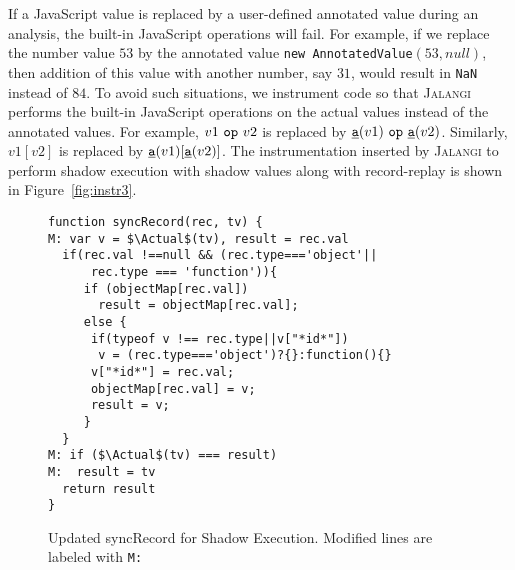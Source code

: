 \documentclass{sig-alternate}
\def\jalangi{\textsc{Jalangi}}
\newcommand \dsl [1] {\ensuremath{{\tt #1}}\xspace}
\newcommand \usl [1] {\mbox{\underline{\tt #1}}\xspace}
\newcommand \Actual{\usl{a}}
\begin{document}
If a JavaScript value is replaced by a user-defined annotated value
during an analysis, the built-in JavaScript operations will fail.  For
example, if we replace the number value $53$ by the annotated value
\texttt{new AnnotatedValue}$(53, null)$, then addition of this value
with another number, say $31$, would result in \texttt{NaN} instead of
$84$.  To avoid such situations, we instrument code so that \jalangi{}
performs the built-in JavaScript operations on the actual values
instead of the annotated values.  For example, $v1\ \dsl{op}\ v2$ is
replaced by $\Actual(v1)\ \dsl{op}\ \Actual(v2)$.  Similarly, $v1[v2]$
is replaced by $\Actual(v1)[\Actual(v2)]$.  The instrumentation
inserted by \jalangi{} to perform shadow execution with shadow values
along with record-replay is shown in Figure~\ref{fig:instr3}.

\lstset{language=JavaScript}
\begin{figure}
 {\scriptsize
\begin{lstlisting}[mathescape]
function syncRecord(rec, tv) {
M: var v = $\Actual$(tv), result = rec.val
  if(rec.val !==null && (rec.type==='object'|| 
      rec.type === 'function')){
     if (objectMap[rec.val])
       result = objectMap[rec.val];
     else {
      if(typeof v !== rec.type||v["*id*"]) 
       v = (rec.type==='object')?{}:function(){}
      v["*id*"] = rec.val;
      objectMap[rec.val] = v;
      result = v;
     }
  }
M: if ($\Actual$(tv) === result)
M:  result = tv
  return result
}
\end{lstlisting}
}
  \caption{Updated syncRecord for Shadow Execution.  Modified lines
    are labeled with \texttt{M:}\vspace*{1ex}}
  \label{fig:lib3}

\end{figure}
\end{document}
